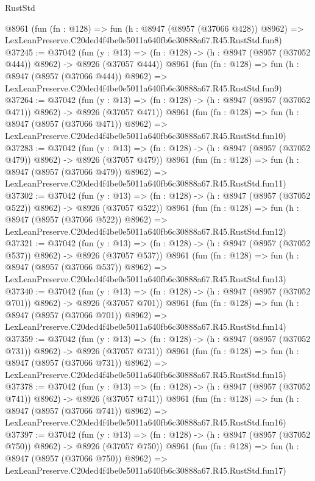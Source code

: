 \begin{lexlean}{RustStd}
\begin{coremodule}
    @8961
    (fun (fn : @128) =>
    fun (h : @8947 (@8957 (@37066 @428)) @8962) =>
    LexLeanPreserve.C20ded4f4be0e5011a640fb6c30888a67.R45.RustStd.fun8)
@37245 := @37042
    (fun (y : @13) => (fn : @128) -> (h : @8947 (@8957 (@37052 @444)) @8962) -> @8926 (@37057 @444))
    @8961
    (fun (fn : @128) =>
    fun (h : @8947 (@8957 (@37066 @444)) @8962) =>
    LexLeanPreserve.C20ded4f4be0e5011a640fb6c30888a67.R45.RustStd.fun9)
@37264 := @37042
    (fun (y : @13) => (fn : @128) -> (h : @8947 (@8957 (@37052 @471)) @8962) -> @8926 (@37057 @471))
    @8961
    (fun (fn : @128) =>
    fun (h : @8947 (@8957 (@37066 @471)) @8962) =>
    LexLeanPreserve.C20ded4f4be0e5011a640fb6c30888a67.R45.RustStd.fun10)
@37283 := @37042
    (fun (y : @13) => (fn : @128) -> (h : @8947 (@8957 (@37052 @479)) @8962) -> @8926 (@37057 @479))
    @8961
    (fun (fn : @128) =>
    fun (h : @8947 (@8957 (@37066 @479)) @8962) =>
    LexLeanPreserve.C20ded4f4be0e5011a640fb6c30888a67.R45.RustStd.fun11)
@37302 := @37042
    (fun (y : @13) => (fn : @128) -> (h : @8947 (@8957 (@37052 @522)) @8962) -> @8926 (@37057 @522))
    @8961
    (fun (fn : @128) =>
    fun (h : @8947 (@8957 (@37066 @522)) @8962) =>
    LexLeanPreserve.C20ded4f4be0e5011a640fb6c30888a67.R45.RustStd.fun12)
@37321 := @37042
    (fun (y : @13) => (fn : @128) -> (h : @8947 (@8957 (@37052 @537)) @8962) -> @8926 (@37057 @537))
    @8961
    (fun (fn : @128) =>
    fun (h : @8947 (@8957 (@37066 @537)) @8962) =>
    LexLeanPreserve.C20ded4f4be0e5011a640fb6c30888a67.R45.RustStd.fun13)
@37340 := @37042
    (fun (y : @13) => (fn : @128) -> (h : @8947 (@8957 (@37052 @701)) @8962) -> @8926 (@37057 @701))
    @8961
    (fun (fn : @128) =>
    fun (h : @8947 (@8957 (@37066 @701)) @8962) =>
    LexLeanPreserve.C20ded4f4be0e5011a640fb6c30888a67.R45.RustStd.fun14)
@37359 := @37042
    (fun (y : @13) => (fn : @128) -> (h : @8947 (@8957 (@37052 @731)) @8962) -> @8926 (@37057 @731))
    @8961
    (fun (fn : @128) =>
    fun (h : @8947 (@8957 (@37066 @731)) @8962) =>
    LexLeanPreserve.C20ded4f4be0e5011a640fb6c30888a67.R45.RustStd.fun15)
@37378 := @37042
    (fun (y : @13) => (fn : @128) -> (h : @8947 (@8957 (@37052 @741)) @8962) -> @8926 (@37057 @741))
    @8961
    (fun (fn : @128) =>
    fun (h : @8947 (@8957 (@37066 @741)) @8962) =>
    LexLeanPreserve.C20ded4f4be0e5011a640fb6c30888a67.R45.RustStd.fun16)
@37397 := @37042
    (fun (y : @13) => (fn : @128) -> (h : @8947 (@8957 (@37052 @750)) @8962) -> @8926 (@37057 @750))
    @8961
    (fun (fn : @128) =>
    fun (h : @8947 (@8957 (@37066 @750)) @8962) =>
    LexLeanPreserve.C20ded4f4be0e5011a640fb6c30888a67.R45.RustStd.fun17)

\end{coremodule}
\end{lexlean}
